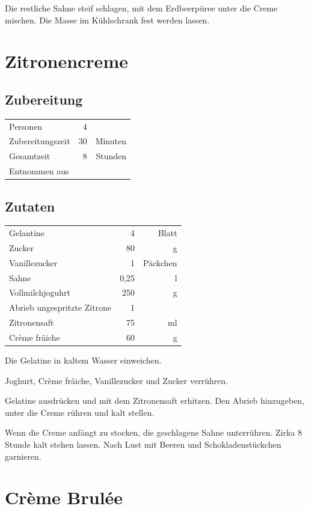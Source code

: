 Die restliche Sahne steif schlagen, mit dem Erdbeerpüree unter die Creme mischen. Die Masse im Kühlschrank fest werden lassen.  

\section{Zitronencreme} 
\subsection*{Zubereitung}
\begin{tabular}{lrr}
	Personen         &  4 &         \\
	Zubereitungszeit & 30 & Minuten \\
	Gesamtzeit       &  8 & Stunden \\
	Entnommen aus    &    &
\end{tabular} 

\subsection*{Zutaten}
\begin{tabular}{lrr}
	Gelantine            &   4 & Blatt \\
	Zucker               &  80 &     g \\
	Vanillezucker       &   1 &    Päckchen \\
	Sahne                & 0,25 &     l \\
	Vollmilchjoguhrt     & 250 &     g \\
	Abrieb ungespritzte Zitrone &   1 &  \\
	Zitronensaft & 75 &ml \\
	Crème frâiche          & 60	    & g
\end{tabular} 

Die Gelatine in kaltem Wasser einweichen. 

Joghurt, Crème frâiche, Vanillezucker und Zucker verrühren.

Gelatine ausdrücken und mit dem Zitronensaft erhitzen. Den Abrieb hinzugeben, unter die Creme rühren und kalt stellen.  

Wenn die Creme anfängt zu stocken, die geschlagene Sahne unterrühren. Zirka 8 Stunde kalt stehen lassen. Nach Lust mit Beeren und Schokladenstückchen garnieren.

\section{Crème Brulée}
